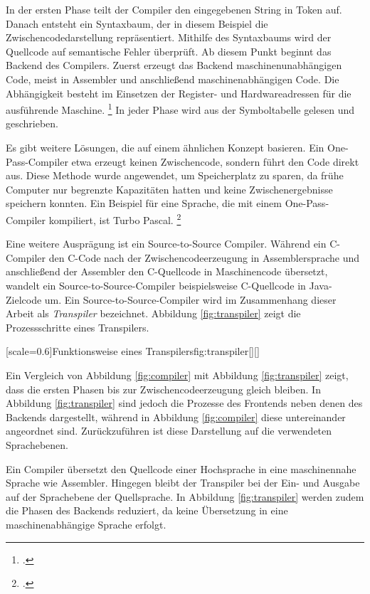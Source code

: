 In der ersten Phase teilt der Compiler den eingegebenen String in Token auf. Danach entsteht ein Syntaxbaum, der in diesem Beispiel die Zwischencodedarstellung repräsentiert. Mithilfe des Syntaxbaums wird der Quellcode auf semantische Fehler überprüft. Ab diesem Punkt beginnt das Backend des Compilers. Zuerst erzeugt das Backend maschinenunabhängigen Code, meist in Assembler und anschließend maschinenabhängigen Code. Die Abhängigkeit besteht im Einsetzen der Register- und Hardwareadressen für die ausführende Maschine.  \footcite[Vgl. ][S.30ff. ]{aho}
In jeder Phase wird aus der Symboltabelle gelesen und geschrieben.

Es gibt weitere Lösungen, die auf einem ähnlichen Konzept basieren.
Ein One-Pass-Compiler etwa erzeugt keinen Zwischencode, sondern führt den Code direkt aus. Diese Methode wurde angewendet, um Speicherplatz zu sparen, da frühe Computer nur begrenzte Kapazitäten hatten und keine Zwischenergebnisse speichern konnten. Ein Beispiel für eine Sprache, die mit einem One-Pass-Compiler kompiliert, ist Turbo Pascal. \footcite[Vgl. ][]{onepass}

Eine weitere Ausprägung ist ein Source-to-Source Compiler. Während ein C-Compiler den C-Code nach der Zwischencodeerzeugung in Assemblersprache und anschließend der Assembler den C-Quellcode in Maschinencode übersetzt, wandelt ein Source-to-Source-Compiler beispielsweise C-Quellcode in Java-Zielcode um. 
Ein Source-to-Source-Compiler wird im Zusammenhang dieser Arbeit als \emph{Transpiler} bezeichnet. Abbildung \ref{fig:transpiler} zeigt die Prozessschritte eines Transpilers.

[scale=0.6]{Funktionsweise eines Transpilers}{fig:transpiler}[][]

Ein Vergleich von Abbildung \ref{fig:compiler} mit Abbildung \ref{fig:transpiler} zeigt, dass die ersten Phasen bis zur Zwischencodeerzeugung gleich bleiben. In Abbildung \ref{fig:transpiler} sind jedoch die Prozesse des Frontends neben denen des Backends dargestellt, während in Abbildung \ref{fig:compiler} diese untereinander angeordnet sind. Zurückzuführen ist diese Darstellung auf die verwendeten Sprachebenen.

Ein Compiler übersetzt den Quellcode einer Hochsprache in eine maschinennahe Sprache wie Assembler. Hingegen bleibt der Transpiler bei der Ein- und Ausgabe auf der Sprachebene der Quellsprache. In Abbildung \ref{fig:transpiler} werden zudem die Phasen des Backends reduziert, da keine Übersetzung in eine maschinenabhängige Sprache erfolgt.

